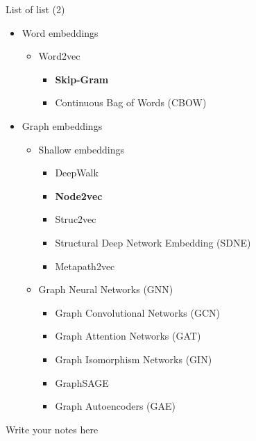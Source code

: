 \documentclass[aspectratio=169]{beamer}
\renewcommand{\alert}[1]{\textbf{\color{swufe}#1}}
\begin{document}
        \begin{frame}{List of list (2)}
            \begin{itemize}
                \item Word embeddings
                \begin{itemize}
                    \item Word2vec
                    \begin{itemize}
                        \item \alert{Skip-Gram}
                        \item Continuous Bag of Words (CBOW)
                    \end{itemize}
                \end{itemize}
                \item Graph embeddings
                \begin{itemize}
                    \item Shallow embeddings
                    \begin{itemize}
                        \item DeepWalk
                        \item \alert{Node2vec}
                        \item Struc2vec
                        \item Structural Deep Network Embedding (SDNE)
                        \item Metapath2vec
                    \end{itemize}
                    \item Graph Neural Networks (GNN)
                    \begin{itemize}
                        \item Graph Convolutional Networks (GCN)
                        \item Graph Attention Networks (GAT)
                        \item Graph Isomorphism Networks (GIN)
                        \item GraphSAGE
                        \item Graph Autoencoders (GAE)
                    \end{itemize}
                \end{itemize}
            \end{itemize}

            \begin{note}
                {Write your notes here}
            \end{note}
        \end{frame}
\end{document}

